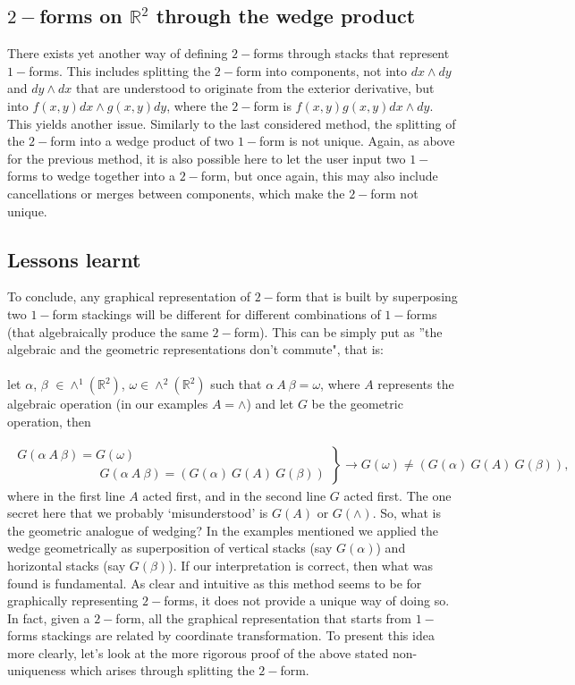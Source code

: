 \documentclass[12pt]{report}
\begin{document}
\subsection{$2-$forms on $\mathbb{R}^2$ through the wedge product}
There exists yet another way of defining $2-$forms through stacks that represent $1-$forms. This includes splitting the $2-$form into components, not into $dx\wedge dy$ and $dy\wedge dx$ that are understood to originate from the exterior derivative, but into $f(x, y)dx \wedge g(x, y)dy$, where the $2-$form is $f(x,y)g(x,y) dx\wedge dy$. This yields another issue. Similarly to the last considered method, the splitting of the $2-$form into a wedge product of two $1-$form is not unique. Again, as above for the previous method, it is also possible here to let the user input two $1-$forms to wedge together into a $2-$form, but once again, this may also include cancellations or merges between components, which make the $2-$form not unique.

\subsection{Lessons learnt}
To conclude, any graphical representation of  $2-$form that is built by superposing two $1-$form stackings will be different for different combinations of $1-$forms (that algebraically produce the same $2-$form). This can be simply put as ''the algebraic and the geometric representations don't commute", that is: \\~\\
let $\alpha$, $\beta$  $\in \wedge^1(\mathbb{R}^2)$, $\omega \in \wedge^2(\mathbb{R}^2)$ such that $\alpha~A~\beta = \omega$, where $A$ represents the algebraic operation (in our examples $A=\wedge$)  and let $G$ be the geometric operation, then 

\begin{eqnarray*}
\left.
\begin{array}{c}
G(\alpha~A~\beta) = G(\omega)\\ 
\,\,\,\,\,\,\,\,\,\,\,\,\,\,\,\,\,\,\,\,\,\,\,\,\,\,\,\,\,\,\,\,\,\,\,\,\,\,\; G(\alpha~A~\beta) = (G(\alpha)~G(A)~G(\beta))
\end{array}
\right \} \to G(\omega) \ne (G(\alpha)~G(A)~G(\beta)),
\end{eqnarray*}
where in the first line $A$ acted first, and in the second line $G$ acted first. The one secret here that we probably `misunderstood' is $G(A)$ or  $G(\wedge)$. So, what is the geometric analogue of wedging? In the examples mentioned we applied the wedge geometrically as superposition of vertical stacks (say $G(\alpha)$) and horizontal stacks (say $G(\beta)$). If our interpretation is correct, then what was found is fundamental. As clear and intuitive as this method seems to be for graphically representing $2-$forms, it does not provide a unique way of doing so. In fact, given a $2-$form, all the graphical representation that starts from $1-$forms stackings are related by coordinate transformation. To present this idea more clearly, let's look at the more rigorous proof of the above stated non-uniqueness which arises through splitting the $2-$form.
\end{document}

